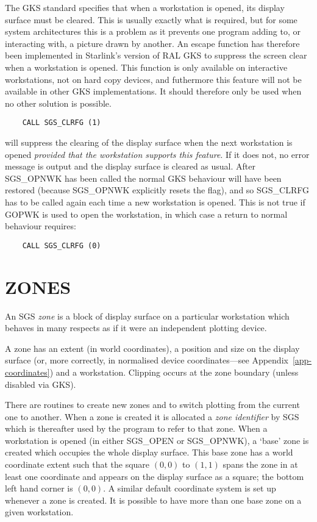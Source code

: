 The GKS standard specifies that when a workstation is opened, its display
surface must be cleared. This is usually exactly what is required, but for
some system architectures this is a problem as it prevents one program adding
to, or interacting with, a picture drawn by another. An escape function
has therefore been implemented in Starlink's version of RAL GKS to suppress
the screen clear when a workstation is opened. This function is only available
on interactive workstations, not on hard copy devices, and futhermore this
feature will not be available in other GKS implementations. It should therefore
only be used when no other solution is possible.
\begin{verbatim}
    CALL SGS_CLRFG (1)
\end{verbatim}
will suppress the clearing of the display surface when the next workstation is
opened {\em provided that the workstation supports this feature}. If it does not,
no error message is output and the display surface is cleared as usual. After
SGS\_OPNWK has been called the normal GKS behaviour will have been restored
(because SGS\_OPNWK explicitly resets the flag), and so SGS\_CLRFG has to be
called again each time a new workstation is opened. This is not true if GOPWK
is used to open the workstation, in which case a return to
normal behaviour requires:
\begin{verbatim}
    CALL SGS_CLRFG (0)
\end{verbatim}

\section {ZONES}

An SGS {\em zone} is a block of display surface on a particular
workstation which behaves in many respects
as if it were an independent plotting device.

A zone has an extent (in world coordinates), a
position and size on the display surface (or, more correctly,
in normalised device coordinates---see
Appendix~\ref{app-coordinates}) and a workstation.  Clipping occurs at the
zone boundary (unless disabled via GKS).

There are routines to create new
zones and to switch plotting from the
current one to another.  When
a zone is created it is allocated a {\em zone identifier} by SGS
which is thereafter used by the program to refer to that
zone.  When a workstation is opened (in either SGS\_OPEN or
SGS\_OPNWK), a `base' zone is created which occupies the
whole display surface.  This base zone has a world coordinate
extent such that the square $(0,0)$ to $(1,1)$ spans the
zone in
at least one
coordinate and appears on the display surface as
a square;  the bottom left hand corner is $(0,0)$.  A similar 
default coordinate system is set
up whenever a zone is created.  It is possible
to have more than one base zone on a given workstation.

